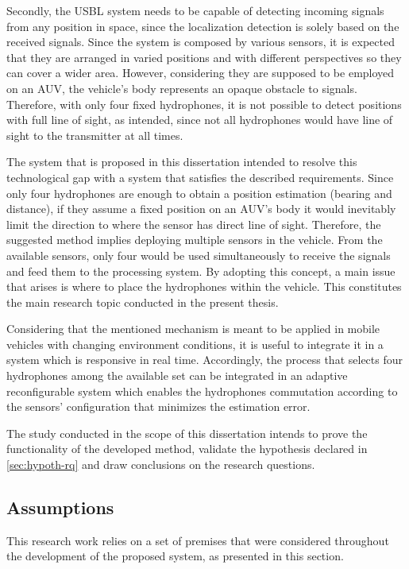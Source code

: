 Secondly, the USBL system needs to be capable of detecting incoming signals from any position in space, since the localization detection is solely based on the received signals. Since the system is composed by various sensors, it is expected that they are arranged in varied positions and with different perspectives so they can cover a wider area. However, considering they are supposed to be employed on an AUV, the vehicle's body represents an opaque obstacle to signals. Therefore, with only four fixed hydrophones, it is not possible to detect positions with full line of sight, as intended, since not all hydrophones would have line of sight to the transmitter at all times.

The system that is proposed in this dissertation intended to resolve this technological gap with a system that satisfies the described requirements. Since only four hydrophones are enough to obtain a position estimation (bearing and distance), if they assume a fixed position on an AUV's body it would inevitably limit the direction to where the sensor has direct line of sight. Therefore, the suggested method implies deploying multiple sensors in the vehicle. From the available sensors, only four would be used simultaneously to receive the signals and feed them to the processing system. By adopting this concept, a main issue that arises is where to place the hydrophones within the vehicle. This constitutes the main research topic conducted in the present thesis.

Considering that the mentioned mechanism is meant to be applied in mobile vehicles with changing environment conditions, it is useful to integrate it in a system which is responsive in real time. Accordingly, the process that selects four hydrophones among the available set can be integrated in an adaptive reconfigurable system which enables the hydrophones commutation according to the sensors' configuration that minimizes the estimation error.

The study conducted in the scope of this dissertation intends to prove the functionality of the developed method, validate the hypothesis declared in \ref{sec:hypoth-rq} and draw conclusions on the research questions.

\subsection{Assumptions} \label{sec:premises}

This research work relies on a set of premises that were considered throughout the development of the proposed system, as presented in this section.

